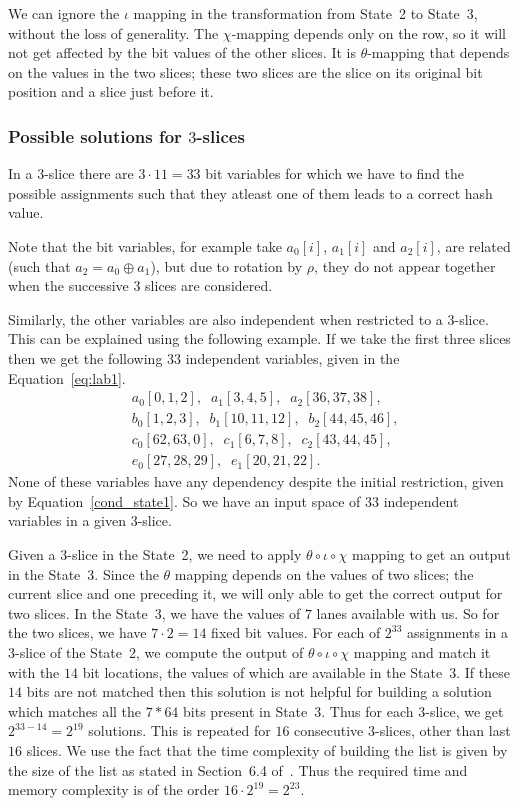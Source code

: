 \documentclass[runningheads]{llncs}
\begin{document}
We can ignore the $\iota$ mapping in the transformation from State~2 to State~3, without the loss of generality. The $\chi$-mapping depends only on the row, so it will not get affected by the bit values of the other slices. It is $\theta$-mapping that depends on the values in the two slices; these two slices are the slice on its original bit position and a slice just before it.

\subsubsection{Possible solutions for $3$-slices} 
In a $3$-slice there are $3 \cdot 11 = 33$ bit variables for which we have to find the possible assignments such that they atleast one of them leads to a correct hash value. 

Note that the bit variables, for example take $a_0[i]$, $a_1[i]$ and $a_2[i]$, are related (such that $a_2 = a_0 \oplus a_1$), but due to rotation by $\rho$, they do not appear together when the successive $3$ slices are considered.

Similarly, the other variables are also independent when restricted to a $3$-slice.
This can be explained using the following example. If we take the first three slices then we get the following $33$ independent variables, given in the Equation~\ref{eq:lab1}.
\begin{equation}
\label{eq:lab1}
\begin{aligned}
&a_0[0,1,2],\;\;a_1[3,4,5],\;\;a_2[36,37,38],\\
&b_0[1,2,3],\;\; b_1[10,11,12],\;\;b_2[44,45,46],\\
&c_0[62,63,0],\;\;c_1[6,7,8],\;\;c_2[43,44,45],\\
&e_0[27,28,29],\;\; e_1[20,21,22].
\end{aligned}
\end{equation}
None of these variables have any dependency despite the initial restriction, given by Equation~\ref{cond_state1}. So we have an input space of $33$ independent variables in a given $3$-slice. 

Given a $3$-slice in the State~2, we need to apply $\theta \circ \iota \circ \chi$ mapping to get an output in the State~3. Since the $\theta$ mapping depends on the values of two slices; the current slice and one preceding it, we will only able to get the correct output for two slices. In the State~3, we have the values of $7$ lanes available with us. So for the two slices, we have $7\cdot 2 = 14$ fixed bit values.
For each of $2^{33}$ assignments in a $3$-slice of the State~2, we compute the output of $\theta \circ \iota \circ \chi$ mapping and match it with the $14$ bit locations, the values of which are available in the State~3. If these $14$ bits are not matched then this solution is not helpful for building a solution which matches all the $7*64$ bits present in State~3.
Thus for each $3$-slice, we get $2^{33-14} = 2^{19}$ solutions. This is repeated for $16$ consecutive $3$-slices, other than last $16$ slices. We use the fact that the time complexity of building the list is given by the size of the list as stated in Section~6.4 of~\cite{naya2011practical}. Thus the required time and memory complexity is of the order $16 \cdot 2^{19} = 2^{23}$.
\end{document}
